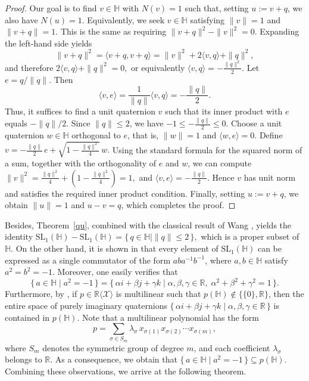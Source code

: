 \documentclass[11pt]{article}
\theoremstyle{definition}
\begin{document}
{{{{\begin{proof}
					Our goal is to find $v \in \mathbb{H}$ with $N(v) = 1$ such that, setting
					$u := v + q$, we also have $N(u) = 1$. Equivalently, we seek $v \in \mathbb{H}$
					satisfying $\|v\| = 1$ and $\|v + q\| = 1$. This is the same as requiring $\|v + q\|^2 - \|v\|^2 = 0.$
					Expanding the left-hand side yields
					$$\|v + q\|^2
					= \langle v + q, v + q \rangle
					= \|v\|^2 + 2\langle v, q \rangle + \|q\|^2,$$
					and therefore $2\langle v, q \rangle + \|q\|^2 = 0,$ or equivalently
					$\langle v, q \rangle = -\frac{\|q\|^2}{2}.$ Let $e = q / \|q\|$. Then
					$$\langle v, e \rangle
					= \frac{1}{\|q\|}\langle v, q \rangle
					= -\frac{\|q\|}{2}.$$
					Thus, it suffices to find a unit quaternion $v$ such that its inner product
					with $e$ equals $-\|q\|/2$. Since $\|q\| \le 2$, we have $-1 \le -\frac{\|q\|}{2} \le 0.$ Choose a unit quaternion $w \in \mathbb{H}$ orthogonal to $e$, that is,
					$\|w\| = 1$ and $\langle w, e \rangle = 0$. Define
					$v = -\frac{\|q\|}{2}\, e
					+ \sqrt{1 - \frac{\|q\|^2}{4}}\, w.$
					Using the standard formula for the squared norm of a sum, together with the
					orthogonality of $e$ and $w$, we can compute $\|v\|^2
					= \frac{\|q\|^2}{4}
					+ \left(1 - \frac{\|q\|^2}{4}\right)
					= 1,$
					and
					$\langle v, e \rangle = -\frac{\|q\|}{2}.$
					Hence $v$ has unit norm and satisfies the required inner product condition.
					Finally, setting $u := v + q$, we obtain $\|u\| = 1$ and $u - v = q$, which
					completes the proof.
				\end{proof}
				
				Besides, Theorem~\ref{qu}, combined with the classical result of Wang \cite{Pa_Wa_50}, yields the identity
				$\mathrm{SL}_1(\mathbb{H}) - \mathrm{SL}_1(\mathbb{H})
				= \{\, q \in \mathbb{H} \mid \|q\| \le 2 \,\},$
				which is a proper subset of $\mathbb{H}$. On the other hand, it is shown in \cite[Lemma 2.1]{Pa_Du_25} that every element of $\mathrm{SL}_1(\mathbb{H})$ can be expressed as a single commutator of the form $aba^{-1}b^{-1}$, where $a, b \in \mathbb{H}$ satisfy $a^2 = b^2 = -1$. Moreover, one easily verifies that $$\{\, a \in \mathbb{H} \mid a^2 = -1 \,\}
				=
				\{\, \alpha i + \beta j + \gamma k \mid \alpha, \beta, \gamma \in \mathbb{R},\; \alpha ^2 + \beta^2 + \gamma^2 = 1 \,\}.$$ Furthermore, by \cite[Theorem 1]{Pa_Ma_21},  if $p \in \mathbb{R}\langle \mathcal{X} \rangle$ is  multilinear  such that $p(\mathbb{H}) \notin \{\{0\}, \mathbb{R}\}$, then the entire space of purely imaginary quaternions
				$\{\, \alpha i + \beta j + \gamma k \mid \alpha, \beta, \gamma \in \mathbb{R} \,\}$
				is contained in $p(\mathbb{H})$. Note that a multilinear polynomial has the form
				$$\displaystyle p = \sum_{\sigma \in S_m} \lambda_\sigma \, x_{\sigma(1)} x_{\sigma(2)} \cdots x_{\sigma(m)},$$
				where $S_m$ denotes the symmetric group of degree $m$, and each coefficient $\lambda_\sigma$ belongs to $\mathbb{R}$. As a consequence, we obtain that $\{\, a \in \mathbb{H} \mid a^2 = -1 \,\} \subseteq p(\mathbb{H}).$ Combining these observations, we arrive at the following theorem.
				
}}}}
\end{document}
